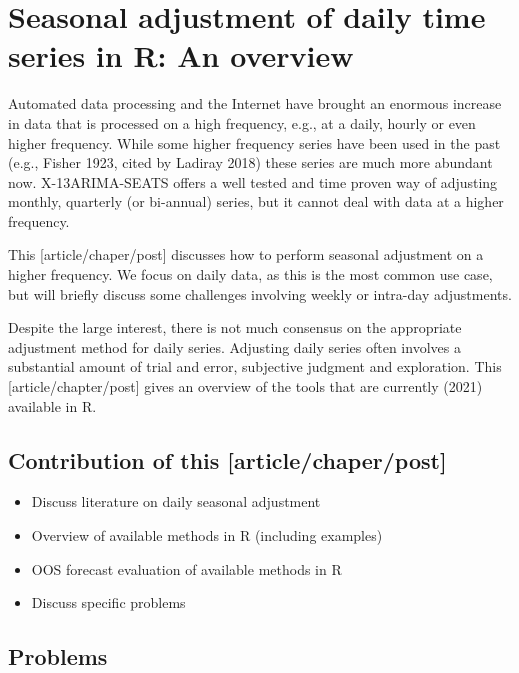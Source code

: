 \documentclass[
]{article}
\author{}
\date{\vspace{-2.5em}}
\providecommand{\tightlist}{%
  \setlength{\itemsep}{0pt}\setlength{\parskip}{0pt}}
\begin{document}
\hypertarget{seasonal-adjustment-of-daily-time-series-in-r-an-overview}{%
\section{Seasonal adjustment of daily time series in R: An
overview}\label{seasonal-adjustment-of-daily-time-series-in-r-an-overview}}

Automated data processing and the Internet have brought an enormous
increase in data that is processed on a high frequency, e.g., at a
daily, hourly or even higher frequency. While some higher frequency
series have been used in the past (e.g., Fisher 1923, cited by Ladiray
2018) these series are much more abundant now. X-13ARIMA-SEATS offers a
well tested and time proven way of adjusting monthly, quarterly (or
bi-annual) series, but it cannot deal with data at a higher frequency.

This {[}article/chaper/post{]} discusses how to perform seasonal
adjustment on a higher frequency. We focus on daily data, as this is the
most common use case, but will briefly discuss some challenges involving
weekly or intra-day adjustments.

Despite the large interest, there is not much consensus on the
appropriate adjustment method for daily series. Adjusting daily series
often involves a substantial amount of trial and error, subjective
judgment and exploration. This {[}article/chapter/post{]} gives an
overview of the tools that are currently (2021) available in R.

\hypertarget{contribution-of-this-articlechaperpost}{%
\subsection{Contribution of this
{[}article/chaper/post{]}}\label{contribution-of-this-articlechaperpost}}

\begin{itemize}
\tightlist
\item
  Discuss literature on daily seasonal adjustment
\item
  Overview of available methods in R (including examples)
\item
  OOS forecast evaluation of available methods in R
\item
  Discuss specific problems
\end{itemize}

\hypertarget{problems}{%
\subsection{Problems}\label{problems}}
\end{document}
